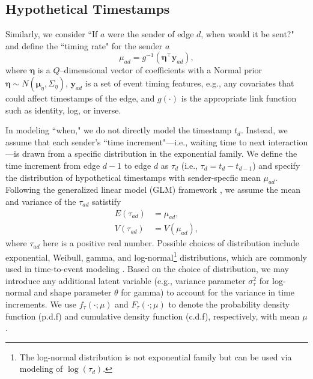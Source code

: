 \documentclass[ba]{imsart}
\numberwithin{equation}{section}
\theoremstyle{plain}
\begin{document}
\subsection{Hypothetical Timestamps}\label{subsec:Time}
Similarly, we consider ``If $a$ were the sender of edge $d$, when would it be sent?" and define the ``timing rate" for the sender $a$
\begin{equation}
\mu_{ad} = g^{-1}(\boldsymbol{\eta}^\top \boldsymbol{y}_{ad}),
\end{equation}
where $\boldsymbol{\eta}$ is a $Q$--dimensional vector of coefficients with a Normal prior $\boldsymbol{\eta} \sim N(\boldsymbol{\mu}_\eta,\Sigma_\eta)$, $\boldsymbol{y}_{ad}$ is a set of event timing features, e.g., any covariates that could affect timestamps of the edge, and $g(\cdot)$ is the appropriate link function such as identity, log, or inverse. 

In modeling ``when," we do not directly model the timestamp $t_d$. Instead, we assume that each sender's ``time increment"---i.e., waiting time to next interaction---is drawn from a specific distribution in the exponential family. We define the time increment from edge $d-1$ to edge $d$ as $\tau_{d}$ (i.e., $\tau_{d}= t_d-t_{d-1}$) and specify the distribution of hypothetical timestamps with sender-specfic mean $\mu_{ad}$. Following the generalized linear model (GLM) framework \citep{nelder1972generalized}, we assume the mean and variance of the $\tau_{ad}$ satistify
\begin{equation}
\begin{aligned}
E(\tau_{ad}) &= \mu_{ad},\\
V(\tau_{ad}) &= V(\mu_{ad}),
\end{aligned}
\end{equation}
where $\tau_{ad}$ here is a positive real number. Possible choices of distribution include exponential, Weibull, gamma, and log-normal\footnote{The log-normal distribution is not exponential family but can be used via modeling of $\log(\tau_d)$.} distributions, which are commonly used in time-to-event modeling \citep{rao2000applied,rizopoulos2012joint}. Based on the choice of distribution, we may introduce any additional latent variable (e.g., variance parameter $\sigma_\tau^2$ for log-normal and shape parameter $\theta$ for gamma) to account for the variance in time increments. We use $f_\tau(\cdot; \mu)$ and $F_\tau(\cdot; \mu)$ to denote the probability density function (p.d.f) and cumulative density function (c.d.f), respectively, with mean $\mu$.
\end{document}
